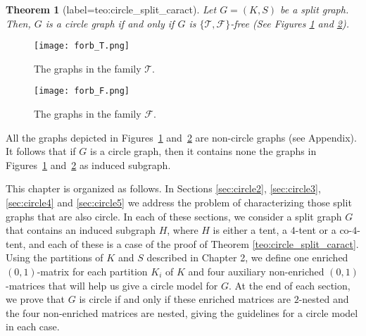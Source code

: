 \documentclass[12pt]{book}
\theoremstyle{plain}
\newtheorem{teo}{Theorem}[chapter]
\theoremstyle{remark}
\begin{document}
\begin{teo}[label={teo:circle_split_caract}]%
	Let $G=(K,S)$ be a split graph. Then, $G$ is a circle graph if and only if $G$ is $\{ \mathcal{T}, \mathcal{F}\}$-free (See Figures \ref{fig:forb_T_graphs2} and \ref{fig:forb_F_graphs2}).
\end{teo}

\begin{figure}[h]
\centering
\texttt{[image: forb\_T.png]} 
\caption{The graphs in the family $\mathcal{T}$.} \label{fig:forb_T_graphs2}
\end{figure}

\begin{figure}[h]
\centering
\texttt{[image: forb\_F.png]} 
\caption{The graphs in the family $\mathcal{F}$.} \label{fig:forb_F_graphs2}
\end{figure}

All the graphs depicted in Figures~\ref{fig:forb_T_graphs2} and~\ref{fig:forb_F_graphs2} are non-circle graphs (see Appendix). It follows that if $G$ is a circle graph, then it contains none the graphs in Figures~\ref{fig:forb_T_graphs2} and~\ref{fig:forb_F_graphs2} as induced subgraph. %

This chapter is organized as follows. %
 In Sections \ref{sec:circle2}, \ref{sec:circle3}, \ref{sec:circle4} and \ref{sec:circle5} we address the problem of characterizing those split graphs that are also circle. In each of these sections, we consider a split graph $G$ that contains an induced subgraph $H$, where $H$ is either a tent, a $4$-tent or a co-$4$-tent, and each of these is a case of the proof of Theorem \ref{teo:circle_split_caract}. 
Using the partitions of $K$ and $S$ described in Chapter 2, we define one enriched $(0,1)$-matrix for each partition $K_i$ of $K$ and four auxiliary non-enriched $(0,1)$-matrices that will help us give a circle model for $G$. At the end of each section, we prove that $G$ is circle if and only if these enriched matrices are $2$-nested and the four non-enriched matrices are nested, giving the guidelines for a circle model in each case.
\end{document}
